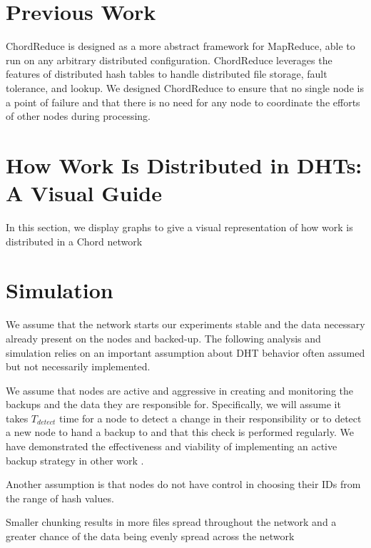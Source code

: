 \section{Previous Work}


ChordReduce \cite{chordreduce} is designed as a more abstract framework for MapReduce, able to run on any arbitrary distributed configuration.
ChordReduce leverages the features of distributed hash tables to handle distributed file storage, fault tolerance, and lookup.
We designed ChordReduce to ensure that no single node is a point of failure and that there is no need for any node to coordinate the efforts of other nodes during processing.

\section{How Work Is Distributed in DHTs: A Visual Guide}
In this section, we display graphs to give a visual representation of how work is distributed in a Chord \cite{chord} network

\section{Simulation}


We assume that the network starts our experiments stable and the data necessary already present on the nodes and backed-up.
The following analysis and simulation relies on an important assumption about DHT behavior often assumed but not necessarily implemented.

We assume that nodes are active and aggressive in creating and monitoring the backups and the data they are responsible for.
Specifically, we will assume it takes  $T_{detect}$ time for a node to detect a change in their responsibility or to detect a new node to hand a backup to and that this check is performed regularly. 
We have demonstrated the effectiveness and viability of implementing an active backup strategy in other work \cite{chordreduce} \cite{urdht}.


Another assumption is that nodes do not have control in choosing their IDs from the range of hash values.

Smaller chunking results in more files spread throughout the  network and a greater chance of the data being evenly spread across the network 

